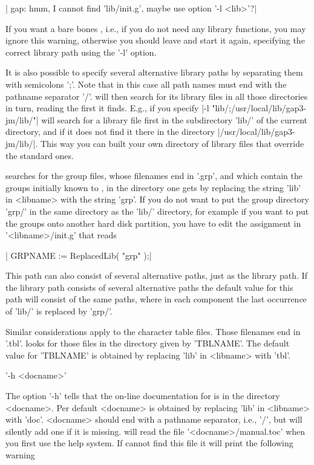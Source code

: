 |    gap: hmm, I cannot find 'lib/init.g', maybe use option '-l <lib>'?|

If  you want  a bare  bones {\GAP},  i.e., if  you do not need any library
functions,  you may ignore this warning, otherwise you should leave {\GAP}
and  start it  again, specifying  the correct  library path  using the '-l'
option.

It  is  also  possible  to  specify  several  alternative  library paths by
separating  them with semicolons ';'. Note that in this case all path names
must  end with the pathname separator '/'. {\GAP} will then search for its
library files in all those directories in turn, reading the first it finds.
E.g.,  if you specify  |-l "lib/;/usr/local/lib/gap3-jm/lib/"| {\GAP} will
search  for a library file first in  the subdirectory 'lib/' of the current
directory,   and  if   it  does   not  find   it  there  in  the  directory
|/usr/local/lib/gap3-jm/lib/|. This way you can built your own directory of
{\GAP} library files that override the standard ones.

{\GAP}  searches for the  group files, whose  filenames end in '.grp', and
which  contain the groups initially known  to {\GAP}, in the directory one
gets  by replacing the string 'lib' in  <libname> with the string 'grp'. If
you  do not want to put the group directory 'grp/' in the same directory as
the  'lib/'  directory,  for  example  if  you  want to put the groups onto
another   hard  disk  partition,  you  have   to  edit  the  assignment  in
'<libname>/init.g' that reads

|    GRPNAME := ReplacedLib( "grp" );|

This  path  can  also  consist  of  several  alternative paths, just as the
library path. If the library path consists of several alternative paths the
default  value for this path will consist  of the same paths, where in each
component the last occurrence of 'lib/' is replaced by 'grp/'.

Similar  considerations apply to the character table files. Those filenames
end  in '.tbl'.  {\GAP} looks  for those  files in  the directory given by
'TBLNAME'.  The default value for 'TBLNAME'  is obtained by replacing 'lib'
in <libname> with 'tbl'.

'-h <docname>'

The option '-h' tells {\GAP} that the on-line documentation for {\GAP} is
in  the directory <docname>. Per default <docname> is obtained by replacing
'lib'  in  <libname>  with  'doc'.  <docname>  should  end  with a pathname
separator,  i.e., '/', but {\GAP} will silently  add one if it is missing.
{\GAP}  will read the  file '<docname>/manual.toc' when  you first use the
help  system. If {\GAP} cannot find this  file it will print the following
warning

